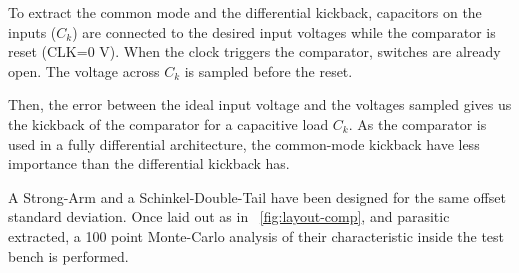 To extract the common mode and the differential kickback, capacitors on the inputs (\(C_{k}\)) are connected to the desired input voltages while the comparator is reset (CLK=0 V). When the clock triggers the comparator, switches are already open. The voltage across \(C_{k}\) is sampled before the reset.

Then, the error between the ideal input voltage and the voltages sampled gives us the kickback of the comparator for a capacitive load \(C_{k}\). As the comparator is used in a fully differential architecture, the common-mode kickback have less importance than the differential kickback has.

A Strong-Arm and a Schinkel-Double-Tail have been designed for the same offset standard deviation. Once laid out as in \figurename~\ref{fig:layout-comp}, and parasitic extracted, a 100 point Monte-Carlo analysis of their characteristic inside the test bench is performed. 

